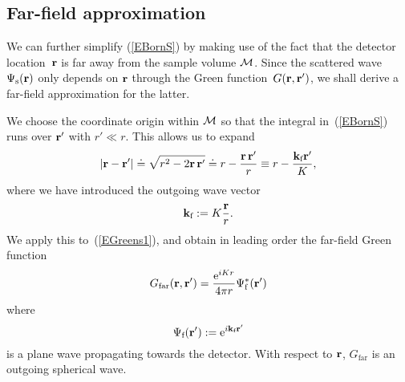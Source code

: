 
\subsection{Far-field approximation}


We can further simplify (\ref{EBornS})
by making use of the fact that the detector location~$\mathbf{r}$
is far away from the sample volume $\mathcal{M}$.
Since the scattered wave $\Psi_\text{s}(\mathbf{r})$
only depends on $\mathbf{r}$ through the Green function~$G(\mathbf{r},\mathbf{r}')$,
we shall derive a far-field approximation for the latter.

We choose the coordinate origin within $\mathcal{M}$
so that the integral in~(\ref{EBornS}) runs over $\mathbf{r}'$ with $r'\ll r$.
This allows us to expand
\begin{equation}
  \left|\mathbf{r}-\mathbf{r}'\right|
  \doteq \sqrt{r^2-2\mathbf{r}\,\mathbf{r}'}
  \doteq r - \frac{\mathbf{r}\,\mathbf{r}'}{r}
  \equiv r - \frac{\mathbf{k}_\text{f} \mathbf{r}'}{K},
\end{equation}
where we have introduced the outgoing wave vector
\begin{equation}
  \mathbf{k}_\text{f}:=K\frac{\mathbf{r}}{r}.
\end{equation}
We apply this to~(\ref{EGreens1}),
and obtain in leading order the far-field Green function
\begin{equation}\label{EGreenFar}
  G_\text{far}(\mathbf{r},\mathbf{r}')
  =\frac{{\rm e}^{iKr}}{4\pi r}\Psi^*_\text{f}(\mathbf{r}')
  \end{equation}
where
\begin{equation}
  \Psi_\text{f}(\mathbf{r}') := {\rm e}^{i\mathbf{k}_\text{f} \mathbf{r}'}
\end{equation}
is a plane wave propagating towards the detector.
With respect to $\mathbf{r}$, $G_\text{far}$ is an outgoing spherical wave.

